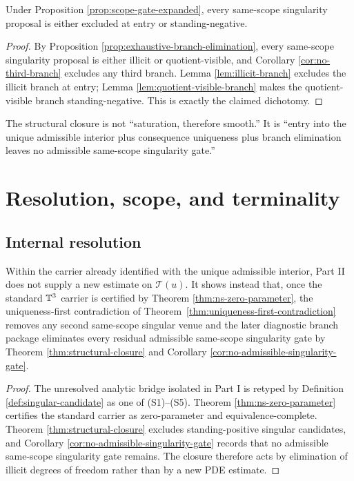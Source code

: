 \begin{corollary}\label{cor:no-admissible-singularity-gate}
Under Proposition \ref{prop:scope-gate-expanded}, every same-scope singularity proposal is either
excluded at entry or standing-negative.
\end{corollary}

\begin{proof}
By Proposition \ref{prop:exhaustive-branch-elimination}, every same-scope singularity proposal is
either illicit or quotient-visible, and Corollary \ref{cor:no-third-branch} excludes any third branch.
Lemma \ref{lem:illicit-branch} excludes the illicit branch at entry; Lemma
\ref{lem:quotient-visible-branch} makes the quotient-visible branch standing-negative. This is exactly
the claimed dichotomy.
\end{proof}

\begin{remark}
The structural closure is not ``saturation, therefore smooth.'' It is ``entry into the unique admissible interior plus
consequence uniqueness plus branch elimination leaves no admissible same-scope singularity gate.''
\end{remark}
\section{Resolution, scope, and terminality}
\subsection{Internal resolution}
\begin{proposition}\label{prop:internal-resolution-structural}
Within the carrier already identified with the unique admissible interior, Part II does not supply a new estimate on $\mathcal T(u)$. It shows
instead that, once the standard $\mathbb{T}^3$ carrier is certified by Theorem \ref{thm:ns-zero-parameter}, the uniqueness-first contradiction of Theorem~\ref{thm:uniqueness-first-contradiction} removes any second same-scope singular venue and the later diagnostic branch package eliminates every residual admissible same-scope singularity gate by Theorem \ref{thm:structural-closure}
and Corollary \ref{cor:no-admissible-singularity-gate}.
\end{proposition}

\begin{proof}
The unresolved analytic bridge isolated in Part I is retyped by Definition \ref{def:singular-candidate}
as one of (S1)--(S5). Theorem \ref{thm:ns-zero-parameter} certifies the standard carrier as
zero-parameter and equivalence-complete. Theorem \ref{thm:structural-closure} excludes
standing-positive singular candidates, and Corollary \ref{cor:no-admissible-singularity-gate}
records that no admissible same-scope singularity gate remains. The closure therefore acts by
elimination of illicit degrees of freedom rather than by a new PDE estimate.
\end{proof}

